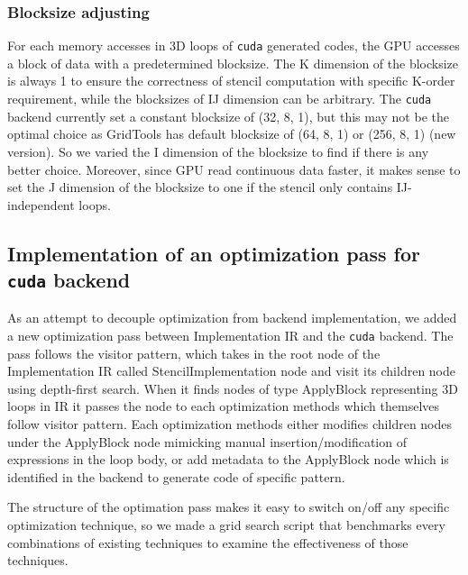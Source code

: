 \documentclass[]{article}
\begin{document}
\subsubsection{Blocksize adjusting}
For each memory accesses in 3D loops of \texttt{cuda} generated codes, the GPU accesses a block of data with a predetermined blocksize. The K dimension of the blocksize is always 1 to ensure the correctness of stencil computation with specific K-order requirement, while the blocksizes of IJ dimension can be arbitrary. The \texttt{cuda} backend currently set a constant blocksize of (32, 8, 1), but this may not be the optimal choice as GridTools has default blocksize of (64, 8, 1) or (256, 8, 1) (new version). So we varied the I dimension of the blocksize to find if there is any better choice. Moreover, since GPU read continuous data faster, it makes sense to set the J dimension of the blocksize to one if the stencil only contains IJ-independent loops.

\subsection{Implementation of an optimization pass for \texttt{cuda} backend}


As an attempt to decouple optimization from backend implementation, we added a new optimization pass between Implementation IR and the \texttt{cuda} backend. The pass follows the visitor pattern, which takes in the root node of the Implementation IR called StencilImplementation node and visit its children node using depth-first search. When it finds nodes of type ApplyBlock representing 3D loops in IR it passes the node to each optimization methods which themselves follow visitor pattern. Each optimization methods either modifies children nodes under the ApplyBlock node mimicking manual insertion/modification of expressions in the loop body, or add metadata to the ApplyBlock node which is identified in the backend to generate code of specific pattern.

The structure of the optimation pass makes it easy to switch on/off any specific optimization technique, so we made a grid search script that benchmarks every combinations of existing techniques to examine the effectiveness of those techniques.
 
\end{document}
